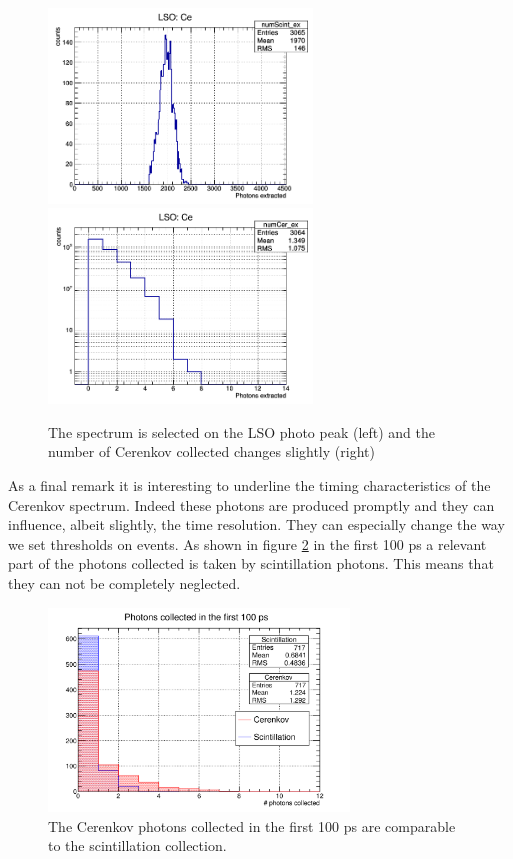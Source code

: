 \begin{figure}[htbp]
\begin{center}
\includegraphics[width=7cm]{../Pictures/Chapter_5/pp_LSO.png}
\includegraphics[width=7cm]{../Pictures/Chapter_5/cer_extr_LSO.png}
\end{center}
\caption[Photopeak selection for Cerenkov simulation]{The spectrum is selected on the LSO photo peak (left) and the number of Cerenkov collected changes slightly (right)}
\label{fig:ceren_pp}
\end{figure}
As a final remark it is interesting to underline the timing characteristics of the Cerenkov spectrum. Indeed these photons are produced promptly and they can influence, albeit slightly, the time resolution. They can especially change the way we set thresholds on events.
As shown in figure \ref{fig:time_ratio} in the first 100 ps a relevant part of the photons collected is taken by scintillation photons. This means that they can not be completely neglected.
\begin{figure}[htbp]
\begin{center}
\includegraphics[width=8cm]{../Pictures/Chapter_5/cer_second_balance.png}
\end{center}
\caption[Scintillation/Cerenkov ratio in the first 100 ps]{The Cerenkov photons collected in the first 100 ps are comparable to the scintillation collection.}
\label{fig:time_ratio}
\end{figure}

